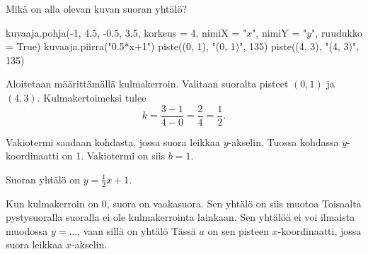 \begin{esimerkki} Mikä on alla olevan kuvan suoran yhtälö?

\begin{kuva}
    kuvaaja.pohja(-1, 4.5, -0.5, 3.5, korkeus = 4, nimiX = "$x$", nimiY = "$y$", ruudukko = True)
    kuvaaja.piirra("0.5*x+1")
    piste((0, 1), "(0, 1)", 135)
    piste((4, 3), "(4, 3)", 135)
\end{kuva}


\begin{esimratk}
Aloitetaan määrittämällä kulmakerroin. Valitaan suoralta pisteet $(0, 1)$ ja $(4, 3)$. Kulmakertoimeksi tulee
\[
k=\frac{3-1}{4-0}=\frac{2}{4}=\frac{1}{2}\text{.}
\]
\end{esimratk}
Vakiotermi saadaan kohdasta, jossa suora leikkaa $y$-akselin. Tuossa kohdassa $y$-koordinaatti on 1. Vakiotermi on siis $b=1$.
\begin{esimvast}
Suoran yhtälö on $y=\frac{1}{2}x+1$.
\end{esimvast}
\end{esimerkki}

Kun kulmakerroin on 0, suora on vaakasuora. Sen yhtälö on siis muotoa
Toisaalta pystysuoralla suoralla ei ole kulmakerrointa lainkaan. Sen yhtälöä ei voi ilmaista muodossa $y=\dots$, vaan sillä on yhtälö
Tässä $a$ on sen pisteen $x$-koordinaatti, jossa suora leikkaa $x$-akselin.

